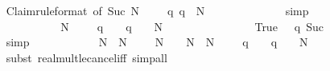 \begin{isabellebody}
\ \ \ \ \ \ \ \ \ \ \ \ \isamarkupfalse%
\ Claim{}{\isacharprime}{\isacharbrackleft}rule{\isacharunderscore}format{\isacharcomma}\ of\ {\isachardoublequoteopen}Suc\ N\ {\isacharplus}\ {}{\isachardoublequoteclose}{\isacharbrackright}\ {\isacharbackquoteopen}{}\ {\isasymle}\ q{\isacharbackquoteclose}\ {\isacharbackquoteopen}q\ {\isasymle}\ N{\isacharbackquoteclose}\isanewline
\ \ \ \ \ \ \ \ \ \ \ \ \isamarkupfalse%
\ simp\isanewline
\ \ \ \ \ \ \ \ \ \ \isamarkupfalse%
\isanewline
\ \ \ \ \ \ \ \ \ \ \isamarkupfalse%
\ {\isachardoublequoteopen}{\isasymDelta}\ {\isacharparenleft}N\ {\isacharplus}\ {}{\isacharparenright}\ {\isasymle}\ {\isasymDelta}\ {\isacharparenleft}q\ {\isacharplus}\ {}{\isacharparenright}\ {\isacharasterisk}\ {\isacharparenleft}q\ {\isacharplus}\ {}{\isacharparenright}\ {\isacharslash}\ {\isacharparenleft}N\ {\isacharplus}\ {}{\isacharparenright}{\isachardoublequoteclose}\isanewline
\ \ \ \ \ \ \ \ \ \ \ \ \isamarkupfalse%
\ True\ {\isacharbackquoteopen}{}\ {\isasymle}\ q{\isacharbackquoteclose}\ Suc{\isacharparenleft}{}{\isacharparenright}\isanewline
\ \ \ \ \ \ \ \ \ \ \ \ \isamarkupfalse%
\ simp\isanewline
\ \ \ \ \ \ \ \ \ \ \isamarkupfalse%
\ {\isachardoublequoteopen}{\isacharparenleft}{\isacharparenleft}N\ {\isacharplus}\ {}{\isacharparenright}{\isacharslash}{\isacharparenleft}N\ {\isacharplus}\ {}{\isacharparenright}{\isacharparenright}\ {\isacharasterisk}\ {\isasymDelta}\ {\isacharparenleft}N\ {\isacharplus}\ {}{\isacharparenright}\ {\isasymle}\ {\isacharparenleft}{\isacharparenleft}N\ {\isacharplus}\ {}{\isacharparenright}{\isacharslash}{\isacharparenleft}N\ {\isacharplus}\ {}{\isacharparenright}{\isacharparenright}\ {\isacharasterisk}\ {\isacharparenleft}{\isasymDelta}\ {\isacharparenleft}q\ {\isacharplus}\ {}{\isacharparenright}\ {\isacharasterisk}\ {\isacharparenleft}q\ {\isacharplus}\ {}{\isacharparenright}\ {\isacharslash}\ {\isacharparenleft}N\ {\isacharplus}\ {}{\isacharparenright}{\isacharparenright}{\isachardoublequoteclose}\isanewline
\ \ \ \ \ \ \ \ \ \ \ \ \isamarkupfalse%
\ {\isacharparenleft}subst\ real{\isacharunderscore}mult{\isacharunderscore}le{\isacharunderscore}cancel{\isacharunderscore}iff{}{\isacharcomma}\ simp{\isacharunderscore}all{\isacharparenright}\isanewline

\end{isabellebody}
